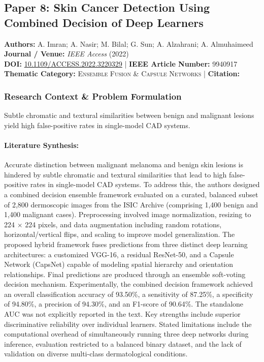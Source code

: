\subsection{Paper 8: Skin Cancer Detection Using Combined Decision of Deep Learners}
\label{sec:paper_8}

\begin{tcolorbox}[colback=gray!5!white,colframe=gray!75!black,title=\textbf{Metadata \& Citation Summary}]
\textbf{Authors:} A. Imran; A. Nasir; M. Bilal; G. Sun; A. Alzahrani; A. Almuhaimeed \\
\textbf{Journal / Venue:} \textit{IEEE Access} (2022) \\
\textbf{DOI:} \href{https://doi.org/10.1109/ACCESS.2022.3220329}{10.1109/ACCESS.2022.3220329} \quad | \quad \textbf{IEEE Article Number:} 9940917 \\
\textbf{Thematic Category:} \textsc{Ensemble Fusion \& Capsule Networks} \quad | \quad \textbf{Citation:} \cite{9940917}
\end{tcolorbox}

\subsubsection*{Research Context \& Problem Formulation}
Subtle chromatic and textural similarities between benign and malignant lesions yield high false-positive rates in single-model CAD systems.

\paragraph{Literature Synthesis:} Accurate distinction between malignant melanoma and benign skin lesions is hindered by subtle chromatic and textural similarities that lead to high false-positive rates in single-model CAD systems. To address this, the authors designed a combined decision ensemble framework evaluated on a curated, balanced subset of 2,800 dermoscopic images from the ISIC Archive (comprising 1,400 benign and 1,400 malignant cases). Preprocessing involved image normalization, resizing to 224 $\times$ 224 pixels, and data augmentation including random rotations, horizontal/vertical flips, and scaling to improve model generalization. The proposed hybrid framework fuses predictions from three distinct deep learning architectures: a customized VGG-16, a residual ResNet-50, and a Capsule Network (CapsNet) capable of modeling spatial hierarchy and orientation relationships. Final predictions are produced through an ensemble soft-voting decision mechanism. Experimentally, the combined decision framework achieved an overall classification accuracy of 93.50\%, a sensitivity of 87.25\%, a specificity of 94.80\%, a precision of 94.30\%, and an F1-score of 90.64\%. The standalone AUC was not explicitly reported in the text. Key strengths include superior discriminative reliability over individual learners. Stated limitations include the computational overhead of simultaneously running three deep networks during inference, evaluation restricted to a balanced binary dataset, and the lack of validation on diverse multi-class dermatological conditions.


